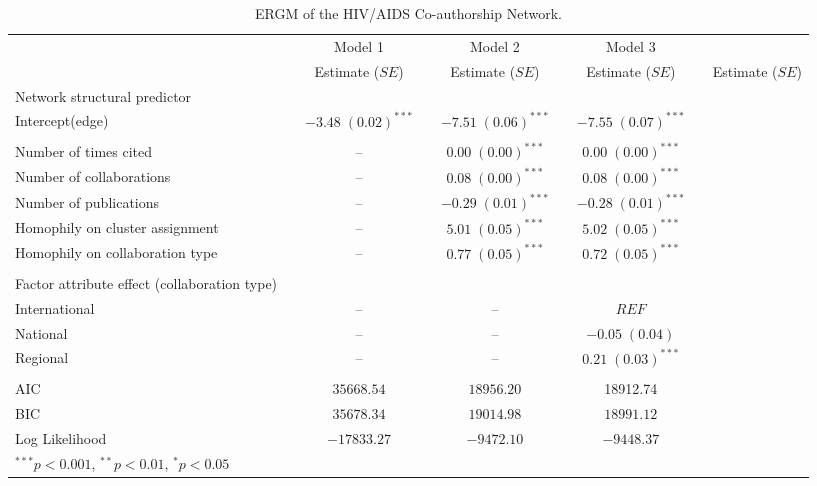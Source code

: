 
\begin{table}
\begin{center}
\begin{tabular}{@{}lcclclcl@{}}
\toprule
           &  & Model 1 &  & Model 2  &  & Model 3\\               &  & Estimate ($SE$) &  & Estimate ($SE$)  &  & Estimate ($SE$) &  & Estimate ($SE$)\\ \midrule
           Network structural predictor &  &   &  &  &  \\
\hspace{10pt}Intercept(edge) & & $-3.48 \; (0.02)^{***}$ & & $-7.51 \; (0.06)^{***}$ & & $-7.55 \; (0.07)^{***}$ \\ \\
Number of times cited        & &       --  & & $0.00 \; (0.00)^{***}$ &  & $0.00 \; (0.00)^{***}$  \\
Number of collaborations     & &  --  & & $0.08 \; (0.00)^{***}$ &  & $0.08 \; (0.00)^{***}$  \\
Number of publications       & &  --  & & $-0.29 \; (0.01)^{***}$ & & $-0.28 \; (0.01)^{***}$ \\
Homophily on cluster assignment &  &   --  &  & $5.01 \; (0.05)^{***}$ &  & $5.02 \; (0.05)^{***}$  \\
Homophily on collaboration type   &   & -- &   & $0.77 \; (0.05)^{***}$ &  & $0.72 \; (0.05)^{***}$  \\ \\
Factor attribute effect (collaboration type) &  &    &  &  &   &   \\
\hspace{10pt}International   &  & --   &  & --   &  & $REF$\\
\hspace{10pt}National        & &  --   &  &  -- & & $-0.05 \; (0.04)$       \\
\hspace{10pt}Regional        & &  --   &  & --  & & $0.21 \; (0.03)^{***}$  \\ \\
\midrule
AIC                          & & $35668.54$ &  & $18956.20$   & & 18912.74   \\
BIC                          & & $35678.34$ &  & $19014.98$   & & $18991.12$  \\
Log Likelihood               & & $-17833.27$ & & $-9472.10$   & & $-9448.37$   \\
\bottomrule
{}
\end{tabular}
\caption{ERGM of the HIV/AIDS Co-authorship Network.}
\label{tab:hiv_ergm}
\end{center}
\end{table}
